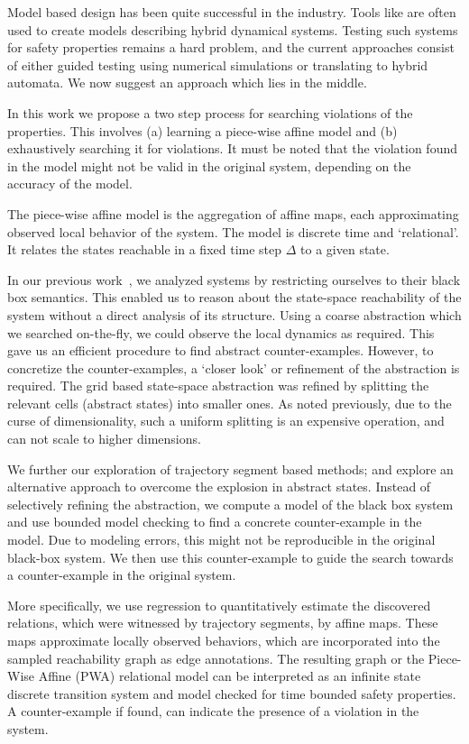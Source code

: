 Model based design has been quite successful in the industry. 
Tools like \SIMULINK are often used to create models describing hybrid
dynamical systems. Testing such systems for safety properties remains
a hard problem, and the current approaches consist of either guided
testing using numerical simulations or translating to hybrid automata.
We now suggest an approach which lies in the middle.

In this work we propose a two step process for searching violations of
the properties. This involves (a) learning a piece-wise affine model
and (b) exhaustively searching it for violations. It must be noted
that the violation found in the model might not be valid in the
original system, depending on the accuracy of the model.

The piece-wise affine model is the aggregation of affine maps, each
approximating observed local behavior of the system.  The model is
discrete time and `relational'. It relates the states reachable in a
fixed time step $\Delta$ to a given state.

In our previous work~\cite{zutshi2014multiple}, we analyzed systems by
restricting ourselves to their black box semantics. This enabled us to
reason about the state-space reachability of the system without a
direct analysis of its structure. Using a coarse abstraction which we
searched on-the-fly, we could observe the local dynamics as required.
This gave us an efficient procedure to find abstract counter-examples.
However, to concretize the counter-examples, a `closer look' or
refinement of the abstraction is required. The grid based state-space
abstraction was refined by splitting the relevant cells (abstract
states) into smaller ones. As noted previously, due to the curse of
dimensionality, such a uniform splitting is an expensive operation,
and can not scale to higher dimensions.

We further our exploration of trajectory segment based methods; and
explore an alternative approach to overcome the explosion in abstract
states. Instead of selectively refining the abstraction, we compute a
model of the black box system and use bounded model checking to find a
concrete counter-example in the model. Due to modeling errors, this
might not be reproducible in the original black-box system. We then
use this counter-example to guide the search towards a counter-example
in the original system.

More specifically, we use regression to quantitatively estimate the
discovered relations, which were witnessed by trajectory segments, by
affine maps. These maps approximate locally observed behaviors, which
are incorporated into the sampled reachability graph as edge
annotations.  The resulting graph or the Piece-Wise Affine (PWA)
relational model can be interpreted as an infinite state discrete
transition system and model checked for time bounded safety
properties. A counter-example if found, can indicate the presence of a
violation in the system.

